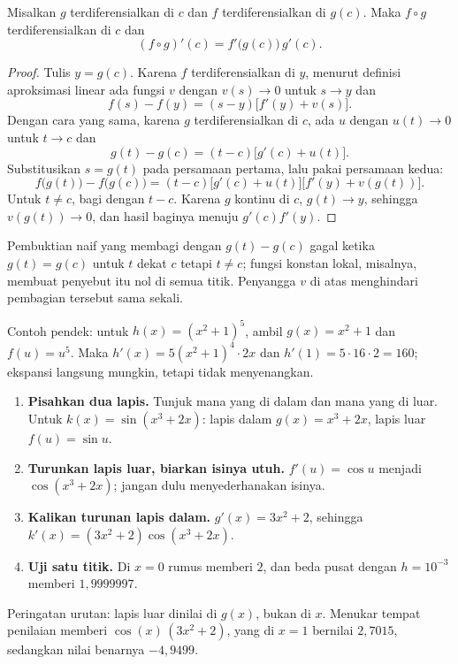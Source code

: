 
\begin{teorema}
Misalkan $g$ terdiferensialkan di $c$ dan $f$ terdiferensialkan di $g(c)$. Maka $f\circ g$
terdiferensialkan di $c$ dan
\[
  (f\circ g)'(c)=f'\bigl(g(c)\bigr)\,g'(c).
\]
\end{teorema}

\begin{proof}
Tulis $y=g(c)$. Karena $f$ terdiferensialkan di $y$, menurut definisi aproksimasi linear
ada fungsi $v$ dengan $v(s)\to0$ untuk $s\to y$ dan
\[
  f(s)-f(y)=(s-y)\bigl[f'(y)+v(s)\bigr].
\]
Dengan cara yang sama, karena $g$ terdiferensialkan di $c$, ada $u$ dengan $u(t)\to0$ untuk
$t\to c$ dan
\[
  g(t)-g(c)=(t-c)\bigl[g'(c)+u(t)\bigr].
\]
Substitusikan $s=g(t)$ pada persamaan pertama, lalu pakai persamaan kedua:
\[
  f\bigl(g(t)\bigr)-f\bigl(g(c)\bigr)
  =(t-c)\bigl[g'(c)+u(t)\bigr]\bigl[f'(y)+v(g(t))\bigr].
\]
Untuk $t\neq c$, bagi dengan $t-c$. Karena $g$ kontinu di $c$, $g(t)\to y$, sehingga
$v(g(t))\to0$, dan hasil baginya menuju $g'(c)f'(y)$.
\end{proof}

Pembuktian naif yang membagi dengan $g(t)-g(c)$ gagal ketika $g(t)=g(c)$ untuk $t$ dekat
$c$ tetapi $t\neq c$; fungsi konstan lokal, misalnya, membuat penyebut itu nol di semua
titik. Penyangga $v$ di atas menghindari pembagian tersebut sama sekali.

Contoh pendek: untuk $h(x)=(x^{2}+1)^{5}$, ambil $g(x)=x^{2}+1$ dan $f(u)=u^{5}$. Maka
$h'(x)=5(x^{2}+1)^{4}\cdot2x$ dan $h'(1)=5\cdot16\cdot2=160$; ekspansi langsung mungkin,
tetapi tidak menyenangkan.

\begin{resep}
\begin{enumerate}
  \item \textbf{Pisahkan dua lapis.} Tunjuk mana yang di dalam dan mana yang di luar. Untuk
        $k(x)=\sin(x^{3}+2x)$: lapis dalam $g(x)=x^{3}+2x$, lapis luar $f(u)=\sin u$.
  \item \textbf{Turunkan lapis luar, biarkan isinya utuh.} $f'(u)=\cos u$ menjadi
        $\cos(x^{3}+2x)$; jangan dulu menyederhanakan isinya.
  \item \textbf{Kalikan turunan lapis dalam.} $g'(x)=3x^{2}+2$, sehingga
        $k'(x)=(3x^{2}+2)\cos(x^{3}+2x)$.
  \item \textbf{Uji satu titik.} Di $x=0$ rumus memberi $2$, dan beda pusat dengan
        $h=10^{-3}$ memberi $1{,}9999997$.
\end{enumerate}
Peringatan urutan: lapis luar dinilai di $g(x)$, bukan di $x$. Menukar tempat penilaian
memberi $\cos(x)\,(3x^{2}+2)$, yang di $x=1$ bernilai $2{,}7015$, sedangkan nilai benarnya
$-4{,}9499$.
\end{resep}

